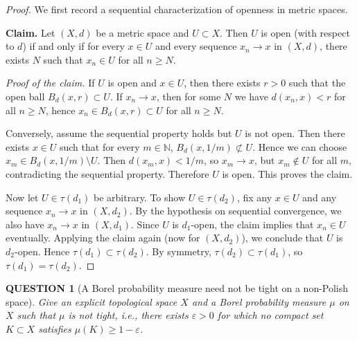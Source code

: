 \documentclass[12pt]{article}
\renewcommand{\(}{\left(}%
\renewcommand{\)}{\right)}%
\renewcommand{\[}{\left[}%
\renewcommand{\]}{\right]}%
\newtheorem{question}{QUESTION}[section]}
\newtheorem{proof}{Proof.}}
\begin{document}
\begin{proof}
We first record a sequential characterization of openness in metric spaces.

\noindent\textbf{Claim.} Let $(X,d)$ be a metric space and $U\subset X$. Then $U$ is open (with respect to $d$) if and only if for every $x\in U$ and every sequence $x_n\to x$ in $(X,d)$, there exists $N$ such that $x_n\in U$ for all $n\ge N$.

\noindent\emph{Proof of the claim.}
If $U$ is open and $x\in U$, then there exists $r>0$ such that the open ball $B_d(x,r)\subset U$. If $x_n\to x$, then for some $N$ we have $d(x_n,x)<r$ for all $n\ge N$, hence $x_n\in B_d(x,r)\subset U$ for all $n\ge N$.

Conversely, assume the sequential property holds but $U$ is not open. Then there exists $x\in U$ such that for every $m\in\mathbb{N}$, $B_d(x,1/m)\not\subset U$. Hence we can choose $x_m\in B_d(x,1/m)\setminus U$. Then $d(x_m,x)<1/m$, so $x_m\to x$, but $x_m\notin U$ for all $m$, contradicting the sequential property. Therefore $U$ is open. This proves the claim.

Now let $U\in\tau(d_1)$ be arbitrary. To show $U\in\tau(d_2)$, fix any $x\in U$ and any sequence $x_n\to x$ in $(X,d_2)$. By the hypothesis on sequential convergence, we also have $x_n\to x$ in $(X,d_1)$. Since $U$ is $d_1$-open, the claim implies that $x_n\in U$ eventually. Applying the claim again (now for $(X,d_2)$), we conclude that $U$ is $d_2$-open. Hence $\tau(d_1)\subset \tau(d_2)$. By symmetry, $\tau(d_2)\subset \tau(d_1)$, so $\tau(d_1)=\tau(d_2)$.
\end{proof}


\begin{question}[A Borel probability measure need not be tight on a non-Polish space]
Give an explicit topological space $X$ and a Borel probability measure $\mu$ on $X$ such that $\mu$ is not tight, i.e., there exists $\varepsilon>0$ for which no compact set $K\subset X$ satisfies $\mu(K)\ge 1-\varepsilon$.
\end{question}
\end{document}
